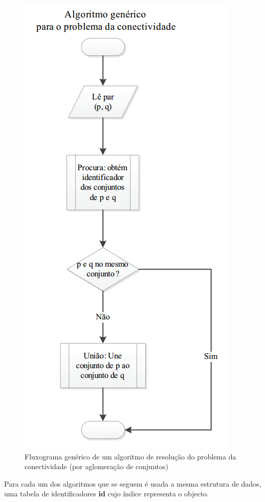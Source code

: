 \documentclass[10pt,a4paper]{article}
\begin{document}
\begin{figure}[h!]
\includegraphics[scale=0.5]{fluxo1.png}
\caption{Fluxograma genérico de um algoritmo de resolução do problema da conectividade (por aglomeração de conjuntos)}
\end{figure}
\par Para cada um dos algoritmos que se seguem é usada a mesma estrutura de dados, uma tabela de identificadores \textbf{id} cujo índice representa o objecto.
\end{document}
